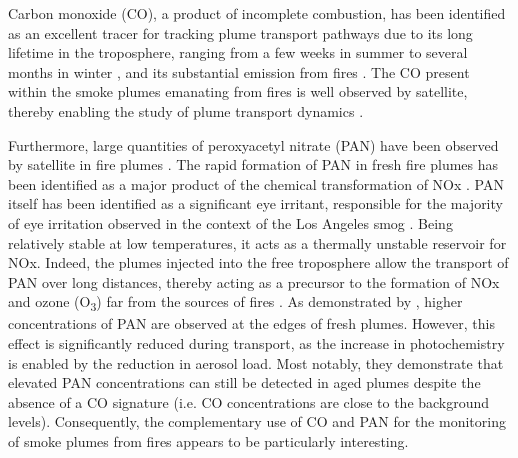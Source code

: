 \documentclass[acp, manuscript]{copernicus}
\begin{document}
Carbon monoxide (CO), a product of incomplete combustion, has been identified as an excellent tracer for tracking plume transport pathways due to its long lifetime in the troposphere, ranging from a few weeks in summer to several months in winter \citep{lelieveldGlobalTroposphericHydroxyl2016}, and its substantial emission from fires \citep{andreaeEmissionTraceGases2019a}. The CO present within the smoke plumes emanating from fires is well observed by satellite, thereby enabling the study of plume transport dynamics \citep[e.g][]{turquetyAPIFLAMEV20Biomass2020,buchholzNewSeasonalPattern2022,alboresContinentalscaleAtmosphericImpacts2023,ceamanosRemoteSensingModel2023}.


Furthermore, large quantities of peroxyacetyl nitrate (PAN) have been observed by satellite in fire plumes \citep{coheurIASIMeasurementsReactive2009,francoGeneralFrameworkGlobal2018a,juncosacalahorranoEvolutionAcylPeroxynitrates2021,wizenbergExceptionalWildfireEnhancements2023,zhaiTranspacificTransportAsian2024}. The rapid formation of PAN in fresh fire plumes has been identified as a major product of the chemical transformation of NOx \citep{pengObservationsModelingNOx2021}. 
PAN itself has been identified as a significant eye irritant, responsible for the majority of eye irritation observed in the context of the Los Angeles smog \citep{gaffneyImpactsPeroxyacetylNitrate2021}.
Being relatively stable at low temperatures, it acts as a thermally unstable reservoir for NOx. 
Indeed, the plumes injected into the free troposphere allow the transport of PAN over long distances, thereby acting as a precursor to the formation of NOx and ozone (O\textsubscript{3}) far from the sources of fires \citep{lindaasChangesOzonePrecursors2017,bourgeoisLargeContributionBiomass2021,lillWildfiredrivenChangesAbundance2022}.
As demonstrated by \citet{wangChemicalTomographyFresh2021}, higher concentrations of PAN are observed at the edges of fresh plumes. However, this effect is significantly reduced during transport, as the increase in photochemistry is enabled by the reduction in aerosol load. Most notably, they demonstrate that elevated PAN concentrations can still be detected in aged plumes despite the absence of a CO signature (i.e. CO concentrations are close to the background levels). Consequently, the complementary use of CO and PAN for the monitoring of smoke plumes from fires appears to be particularly interesting. 
\end{document}
